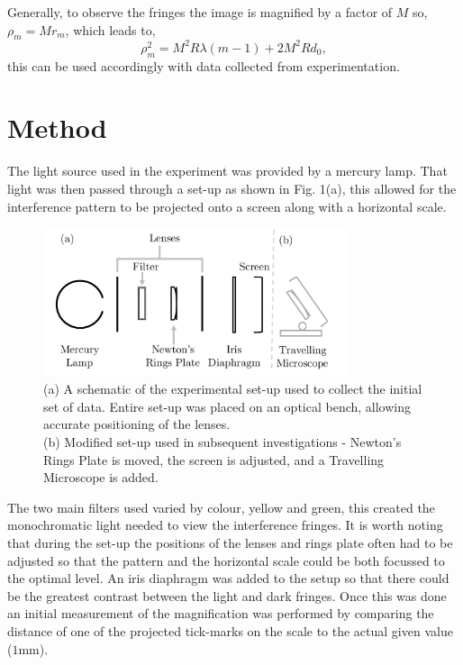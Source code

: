 \documentclass[twocolumn]{revtex4}
\newcommand{\squeezeup}{\vspace{-2.5mm}}
\begin{document}
Generally, to observe the fringes the image is magnified by a factor of $M$ so, $\rho_m=Mr_m$, which leads to, 
\begin{equation} \tag{3}
\rho_m^2=M^2R\lambda{(m-1)}+2M^2Rd_0,
\end{equation}
this can be used accordingly with data collected from experimentation.
\\

\vspace{-3ex}
\section{Method} 
\vspace{-2ex}
The light source used in the experiment was provided by a mercury lamp. That light was then passed through a set-up as shown in Fig. 1(a), this allowed for the interference pattern to be projected onto a screen along with a horizontal scale. 

\begin{figure}[!h]
\begin{center}
\includegraphics[width=9cm]{fig1}
\caption[]{(a) A schematic of the experimental set-up used to collect the initial set of data. Entire set-up was placed on an optical bench, allowing accurate positioning of the lenses.
\\
(b) Modified set-up used in subsequent investigations - Newton's Rings Plate is moved, the screen is adjusted, and a Travelling Microscope is added.}
\label{fig:fig1}
\end{center}
\end{figure}

\squeezeup
\squeezeup

The two main filters used varied by colour, yellow and green, this created the monochromatic light needed to view the interference fringes. It is worth noting that during the set-up the positions of the lenses and rings plate often had to be adjusted so that the pattern and the horizontal scale could be both focussed to the optimal level. An iris diaphragm was added to the setup so that there could be the greatest contrast between the light and dark fringes. Once this was done an initial measurement of the magnification was performed by comparing the distance of one of the projected tick-marks on the scale to the actual given value ($1$mm). 
\end{document}
